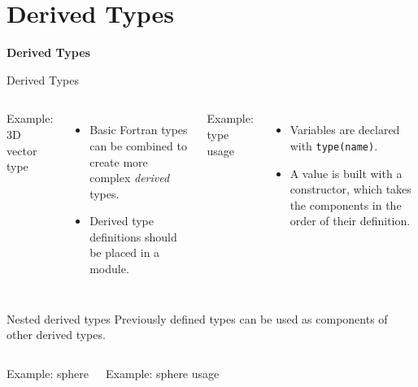 
\subtitle{Lecture 6: Derived Types, Linked Lists, and Custom Operators}



\begin{frame}
  \titlepage
\end{frame}

\section{Derived Types}

\begin{frame}
	\centering
	\Huge \textbf{Derived Types}
\end{frame}

\begin{frame}[fragile]{Derived Types}

\begin{columns}[T]
  \begin{block}{Example: 3D vector type}
    
  \end{block}
  \begin{itemize}
  \item Basic Fortran types can be combined to create more complex \textit{derived} types.
  \item Derived type definitions should be placed in a module.
  \end{itemize}

  \begin{block}{Example: type usage}
  
  \end{block}
  \begin{itemize}
  \item Variables are declared with \texttt{type(name)}.
  \item A value is built with a constructor, which takes the components in the order of their definition.
  \end{itemize}

\end{columns}
\end{frame}

\begin{frame}[fragile]{Nested derived types}
  Previously defined types can be used as components of other derived types.
\begin{columns}[T,onlytextwidth]
  \begin{block}{Example: sphere}
    
  \end{block}

    \begin{block}{Example: sphere usage}
    
  \end{block}
  \end{columns}
\end{frame}


